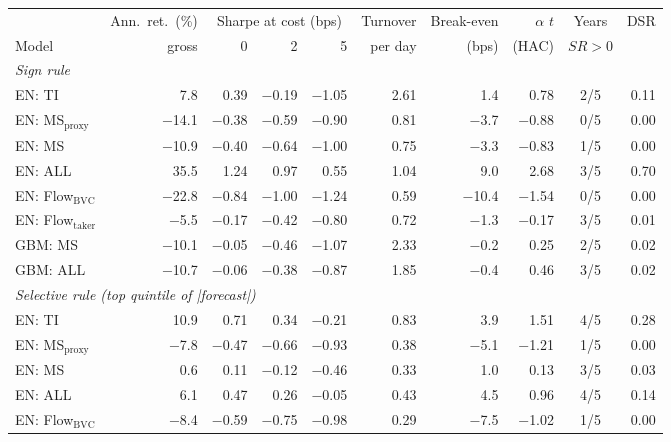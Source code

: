 \begin{tabular}{lrrrrrrrcr}
\toprule
& Ann.\ ret.\ (\%) & \multicolumn{3}{c}{Sharpe at cost (bps)} & Turnover & Break-even & $\alpha$ $t$ & Years & DSR\\
\cmidrule(lr){3-5} Model & gross & 0 & 2 & 5 & per day & (bps) & (HAC) & $SR>0$ & \\
\midrule
\multicolumn{10}{l}{\emph{Sign rule}}\\
EN: TI & 7.8 & 0.39 & \ensuremath{-}0.19 & \ensuremath{-}1.05 & 2.61 & 1.4 & 0.78 & 2/5 & 0.11\\
EN: MS$_{\text{proxy}}$ & \ensuremath{-}14.1 & \ensuremath{-}0.38 & \ensuremath{-}0.59 & \ensuremath{-}0.90 & 0.81 & \ensuremath{-}3.7 & \ensuremath{-}0.88 & 0/5 & 0.00\\
EN: MS & \ensuremath{-}10.9 & \ensuremath{-}0.40 & \ensuremath{-}0.64 & \ensuremath{-}1.00 & 0.75 & \ensuremath{-}3.3 & \ensuremath{-}0.83 & 1/5 & 0.00\\
EN: ALL & 35.5 & 1.24 & 0.97 & 0.55 & 1.04 & 9.0 & 2.68 & 3/5 & 0.70\\
EN: Flow$_{\text{BVC}}$ & \ensuremath{-}22.8 & \ensuremath{-}0.84 & \ensuremath{-}1.00 & \ensuremath{-}1.24 & 0.59 & \ensuremath{-}10.4 & \ensuremath{-}1.54 & 0/5 & 0.00\\
EN: Flow$_{\text{taker}}$ & \ensuremath{-}5.5 & \ensuremath{-}0.17 & \ensuremath{-}0.42 & \ensuremath{-}0.80 & 0.72 & \ensuremath{-}1.3 & \ensuremath{-}0.17 & 3/5 & 0.01\\
GBM: MS & \ensuremath{-}10.1 & \ensuremath{-}0.05 & \ensuremath{-}0.46 & \ensuremath{-}1.07 & 2.33 & \ensuremath{-}0.2 & 0.25 & 2/5 & 0.02\\
GBM: ALL & \ensuremath{-}10.7 & \ensuremath{-}0.06 & \ensuremath{-}0.38 & \ensuremath{-}0.87 & 1.85 & \ensuremath{-}0.4 & 0.46 & 3/5 & 0.02\\
\multicolumn{10}{l}{\emph{Selective rule (top quintile of |forecast|)}}\\
EN: TI & 10.9 & 0.71 & 0.34 & \ensuremath{-}0.21 & 0.83 & 3.9 & 1.51 & 4/5 & 0.28\\
EN: MS$_{\text{proxy}}$ & \ensuremath{-}7.8 & \ensuremath{-}0.47 & \ensuremath{-}0.66 & \ensuremath{-}0.93 & 0.38 & \ensuremath{-}5.1 & \ensuremath{-}1.21 & 1/5 & 0.00\\
EN: MS & 0.6 & 0.11 & \ensuremath{-}0.12 & \ensuremath{-}0.46 & 0.33 & 1.0 & 0.13 & 3/5 & 0.03\\
EN: ALL & 6.1 & 0.47 & 0.26 & \ensuremath{-}0.05 & 0.43 & 4.5 & 0.96 & 4/5 & 0.14\\
EN: Flow$_{\text{BVC}}$ & \ensuremath{-}8.4 & \ensuremath{-}0.59 & \ensuremath{-}0.75 & \ensuremath{-}0.98 & 0.29 & \ensuremath{-}7.5 & \ensuremath{-}1.02 & 1/5 & 0.00\\

\end{tabular}
